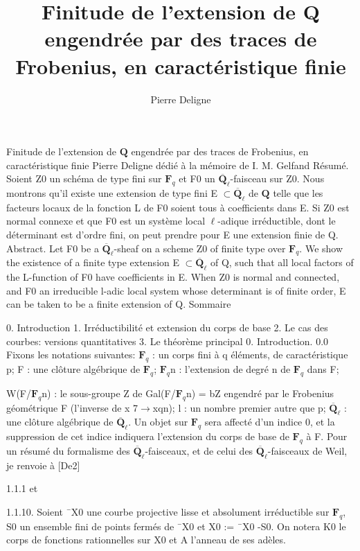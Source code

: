 \documentclass[11pt]{article}
\title{Finitude de l’extension de Q engendrée par des traces de Frobenius, en caractéristique finie}
\author{Pierre Deligne}
\date{}
\begin{document}
\maketitle
\sloppy
Finitude de l’extension de \(\mathbf Q\) engendrée par des traces de Frobenius, en caractéristique finie Pierre Deligne dédié à la mémoire de I. M. Gelfand Résumé. Soient Z0 un schéma de type fini sur \(\mathbf F_q\) et F0 un \(\overline{\mathbf Q}_\ell\)-faisceau sur Z0. Nous montrons qu’il existe une extension de type fini E \(\subset\)\(\overline{\mathbf Q}_\ell\) de \(\mathbf Q\) telle que les facteurs locaux de la fonction L de F0 soient tous à coefficients dans E. Si Z0 est normal connexe et que F0 est un système local \(\ell\)-adique irréductible, dont le déterminant est d’ordre fini, on peut prendre pour E une extension finie de Q. Abstract. Let F0 be a \(\overline{\mathbf Q}_\ell\)-sheaf on a scheme Z0 of finite type over \(\mathbf F_q\). We show the existence of a finite type extension E \(\subset\)\(\overline{\mathbf Q}_\ell\) of Q, such that all local factors of the L-function of F0 have coefficients in E. When Z0 is normal and connected, and F0 an irreducible l-adic local system whose determinant is of finite order, E can be taken to be a finite extension of Q. Sommaire

0. Introduction 1. Irréductibilité et extension du corps de base 2. Le cas des courbes: versions quantitatives 3. Le théorème principal 0. Introduction. 0.0 Fixons les notations suivantes: \(\mathbf F_q\) : un corps fini à q éléments, de caractéristique p; F : une clôture algébrique de \(\mathbf F_q\); \(\mathbf F_q\)n : l’extension de degré n de \(\mathbf F_q\) dans F;

W(F/\(\mathbf F_q\)n) : le sous-groupe Z de Gal(F/\(\mathbf F_q\)n) = bZ engendré par le Frobenius géométrique F (l’inverse de x 7\(\to\)xqn); l : un nombre premier autre que p; \(\overline{\mathbf Q}_\ell\) : une clôture algébrique de \(\overline{\mathbf Q}_\ell\). Un objet sur \(\mathbf F_q\) sera affecté d’un indice 0, et la suppression de cet indice indiquera l’extension du corps de base de \(\mathbf F_q\) à F. Pour un résumé du formalisme des \(\overline{\mathbf Q}_\ell\)-faisceaux, et de celui des \(\overline{\mathbf Q}_\ell\)-faisceaux de Weil, je renvoie à [De2] 

1.1.1 et 

1.1.10. Soient ¯X0 une courbe projective lisse et absolument irréductible sur \(\mathbf F_q\), S0 un ensemble fini de points fermés de ¯X0 et X0 := ¯X0 -S0. On notera K0 le corps de fonctions rationnelles sur X0 et A l’anneau de ses adèles. 
\end{document}

